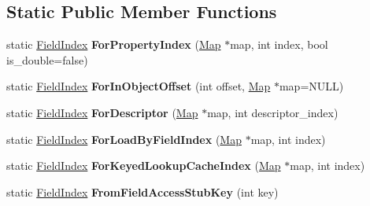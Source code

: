 \subsection*{Static Public Member Functions}
\begin{DoxyCompactItemize}
\item 
static \hyperlink{classv8_1_1internal_1_1_field_index}{Field\+Index} {\bfseries For\+Property\+Index} (\hyperlink{classv8_1_1internal_1_1_map}{Map} $\ast$map, int index, bool is\+\_\+double=false)\hypertarget{classv8_1_1internal_1_1_field_index_ace31920d490629e2cfba6a506497cc61}{}\label{classv8_1_1internal_1_1_field_index_ace31920d490629e2cfba6a506497cc61}

\item 
static \hyperlink{classv8_1_1internal_1_1_field_index}{Field\+Index} {\bfseries For\+In\+Object\+Offset} (int offset, \hyperlink{classv8_1_1internal_1_1_map}{Map} $\ast$map=N\+U\+LL)\hypertarget{classv8_1_1internal_1_1_field_index_a99ce2d2813ce6a235ebdd6354f98a378}{}\label{classv8_1_1internal_1_1_field_index_a99ce2d2813ce6a235ebdd6354f98a378}

\item 
static \hyperlink{classv8_1_1internal_1_1_field_index}{Field\+Index} {\bfseries For\+Descriptor} (\hyperlink{classv8_1_1internal_1_1_map}{Map} $\ast$map, int descriptor\+\_\+index)\hypertarget{classv8_1_1internal_1_1_field_index_a7957666120483a287cdb232c8da1d65c}{}\label{classv8_1_1internal_1_1_field_index_a7957666120483a287cdb232c8da1d65c}

\item 
static \hyperlink{classv8_1_1internal_1_1_field_index}{Field\+Index} {\bfseries For\+Load\+By\+Field\+Index} (\hyperlink{classv8_1_1internal_1_1_map}{Map} $\ast$map, int index)\hypertarget{classv8_1_1internal_1_1_field_index_ac77afed23a8efe5b14b54e29b9938396}{}\label{classv8_1_1internal_1_1_field_index_ac77afed23a8efe5b14b54e29b9938396}

\item 
static \hyperlink{classv8_1_1internal_1_1_field_index}{Field\+Index} {\bfseries For\+Keyed\+Lookup\+Cache\+Index} (\hyperlink{classv8_1_1internal_1_1_map}{Map} $\ast$map, int index)\hypertarget{classv8_1_1internal_1_1_field_index_a53af83fd66f0a9e67b1a9206e36f59b4}{}\label{classv8_1_1internal_1_1_field_index_a53af83fd66f0a9e67b1a9206e36f59b4}

\item 
static \hyperlink{classv8_1_1internal_1_1_field_index}{Field\+Index} {\bfseries From\+Field\+Access\+Stub\+Key} (int key)\hypertarget{classv8_1_1internal_1_1_field_index_a0aefd1279330d6e464f988bdc8627215}{}\label{classv8_1_1internal_1_1_field_index_a0aefd1279330d6e464f988bdc8627215}

\end{DoxyCompactItemize}
